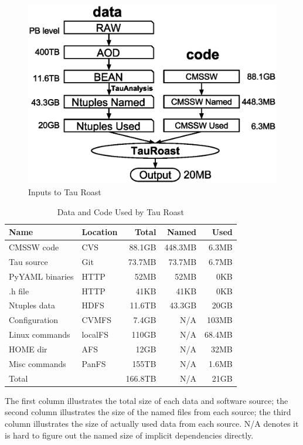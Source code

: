 \documentclass{sig-alternate}
\begin{document}
\begin{figure}[t]
\centering
\includegraphics[width=.8\columnwidth]{data-code-size.eps}
\caption{Inputs to Tau Roast}
\label{fig:data-code-size}
\end{figure}

\begin{table}[t]
    \centering
    \small
    \begin{tabular}{|l|l|r|r|r|}
        \hline
        \bf Name & \bf Location & \bf Total & \bf Named & \bf Used \\ 
        \hline
        CMSSW code     & CVS & 88.1GB & 448.3MB & 6.3MB\\ \hline
        Tau source       & Git & 73.7MB & 73.7MB & 6.7MB \\ \hline
        PyYAML binaries    & HTTP & 52MB & 52MB & 0KB \\ \hline
        .h file       & HTTP& 41KB & 41KB & 0KB \\ \hline \hline
        Ntuples data    & HDFS& 11.6TB & 43.3GB & 20GB \\ \hline
        Configuration & CVMFS & 7.4GB & N/A & 103MB \\ \hline
        Linux commands & localFS & 110GB &  N/A & 68.4MB \\ \hline     
        HOME dir& AFS &12GB & N/A & 32MB\\ \hline
        Misc commands & PanFS & 155TB & N/A  & 1.6MB \\ \hline
        Total      &    & 166.8TB            & N/A & 21GB \\ \hline
    \end{tabular}
    \begin{tablenotes}
      \small
      \item The first column illustrates the total size of each data and software source; 
            the second column illustrates the size of the named files from each source;
            the third column illustrates the size of actually used data from each source.
            N/A denotes it is hard to figure out the named size of implicit dependencies directly.        
    \end{tablenotes}
    \caption{Data and Code Used by Tau Roast}
    \label{table:size-original-real}
\end{table}
\end{document}
